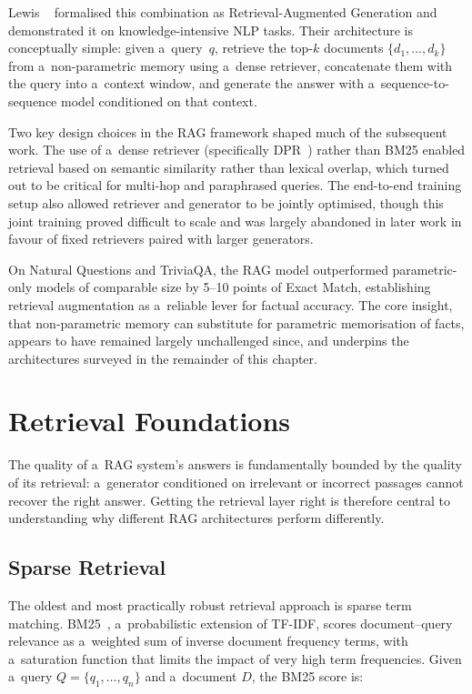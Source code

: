 Lewis \etal~\cite{lewis2020rag} formalised this combination as Retrieval-Augmented
Generation and demonstrated it on knowledge-intensive NLP tasks.
Their architecture is conceptually simple: given a~query~$q$, retrieve the
top-$k$ documents $\{d_1, \ldots, d_k\}$ from a~non-parametric memory using a~dense
retriever, concatenate them with the query into a~context window, and generate the
answer with a~sequence-to-sequence model conditioned on that context.

Two key design choices in the RAG framework shaped much of the subsequent work.
The use of a~dense retriever (specifically DPR~\cite{karpukhin2020dpr}) rather
than BM25 enabled retrieval based on semantic similarity rather than lexical overlap,
which turned out to be critical for multi-hop and paraphrased queries.
The end-to-end training setup also allowed retriever and generator to be
jointly optimised, though this joint training proved difficult to scale
and was largely abandoned in later work in favour of fixed retrievers
paired with larger generators.

On Natural Questions and TriviaQA, the RAG model outperformed parametric-only
models of comparable size by 5--10 points of Exact Match, establishing retrieval
augmentation as a~reliable lever for factual accuracy.
The core insight, that non-parametric memory can substitute for parametric
memorisation of facts, appears to have remained largely unchallenged since,
and underpins the architectures surveyed in the remainder of this chapter.

\section{Retrieval Foundations}
\label{sec:retrieval_foundations}

The quality of a~RAG system's answers is fundamentally bounded by the quality of
its retrieval: a~generator conditioned on irrelevant or incorrect passages cannot
recover the right answer.
Getting the retrieval layer right is therefore central to understanding why different
RAG architectures perform differently.

\subsection{Sparse Retrieval}

The oldest and most practically robust retrieval approach is sparse term matching.
BM25~\cite{robertson2009bm25}, a~probabilistic extension of TF-IDF, scores document--query
relevance as a~weighted sum of inverse document frequency terms,
with a~saturation function that limits the impact of very high term frequencies.
Given a~query $Q = \{q_1, \ldots, q_n\}$ and a~document $D$, the BM25 score is:

